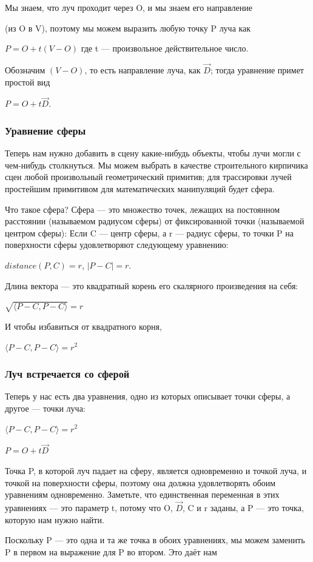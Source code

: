 Мы знаем, что луч проходит через O, и мы знаем его направление

(из O в V), поэтому мы можем выразить любую точку P луча как

$P = O + t(V - O)$ где t — произвольное действительное число.

Обозначим $(V - O)$, то есть направление луча, как $\vec{D}$; тогда уравнение примет простой вид

$P = O + t\vec{D}$.
\subsubsection{Уравнение сферы}\label{3}
Теперь нам нужно добавить в сцену какие-нибудь объекты, чтобы лучи могли с чем-нибудь столкнуться. Мы можем выбрать в качестве строительного кирпичика сцен любой произвольный геометрический примитив; для трассировки лучей простейшим примитивом для математических манипуляций будет сфера.

Что такое сфера? Сфера — это множество точек, лежащих на постоянном расстоянии (называемом радиусом сферы) от фиксированной точки (называемой центром сферы):
Если C — центр сферы, а r — радиус сферы, то точки P на поверхности сферы удовлетворяют следующему уравнению:

$distance(P, C) = r$, $|P - C| = r$.

Длина вектора — это квадратный корень его скалярного произведения на себя:

$\sqrt{\langle P - C, P - C \rangle} = r$

И чтобы избавиться от квадратного корня,

$\langle P - C, P - C \rangle = r^2$

\subsubsection{Луч встречается со сферой}\label{4}
Теперь у нас есть два уравнения, одно из которых описывает точки сферы, а другое — точки луча:

$\langle P - C, P - C \rangle = r^2$

$P = O + t\vec{D}$

Точка P, в которой луч падает на сферу, является одновременно и точкой луча, и точкой на поверхности сферы, поэтому она должна удовлетворять обоим уравнениям одновременно. Заметьте, что единственная переменная в этих уравнениях — это параметр t, потому что O, $\vec{D}$, C и r заданы, а P — это точка, которую нам нужно найти.

Поскольку P — это одна и та же точка в обоих уравнениях, мы можем заменить P в первом на выражение для P во втором. Это даёт нам


